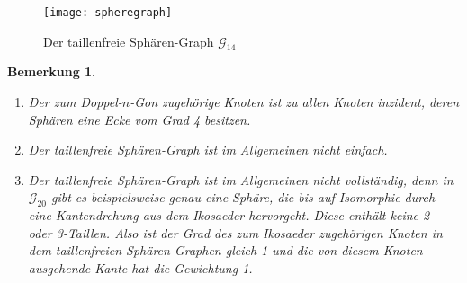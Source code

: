 \documentclass[12pt,titlepage,twoside,cleardoublepage]{article}
\theoremstyle{nummermitklammern}
\newtheorem{bemerkung}[temp]{Bemerkung}
\newtheorem{bemerkung}[zahl]{Bemerkung}
\numberwithin{equation}{section}
\begin{document}
 \begin{figure}[H]
\begin{center}
\texttt{[image: spheregraph]}
\end{center}
\caption{Der taillenfreie Sphären-Graph $\mathcal{G}_{14}$}
\end{figure}
 \begin{bemerkung}
 \begin{enumerate}
 \item Der zum Doppel-$n$-Gon zugehörige Knoten ist zu allen Knoten inzident, deren Sphären eine Ecke vom Grad 4 besitzen.
 \item Der taillenfreie Sphären-Graph ist im Allgemeinen nicht einfach.
 \item Der taillenfreie Sphären-Graph ist im Allgemeinen nicht vollständig, denn in $\mathcal{G}_{20}$ gibt es beispielsweise genau eine Sphäre, die bis auf Isomorphie durch eine Kantendrehung aus dem Ikosaeder hervorgeht. Diese enthält keine 2- oder 3-Taillen. Also ist der Grad des zum Ikosaeder zugehörigen Knoten in dem taillenfreien Sphären-Graphen gleich 1 und die von diesem Knoten ausgehende Kante hat die Gewichtung 1.
 \end{enumerate}
 \end{bemerkung}
\newpage 
\end{document}
